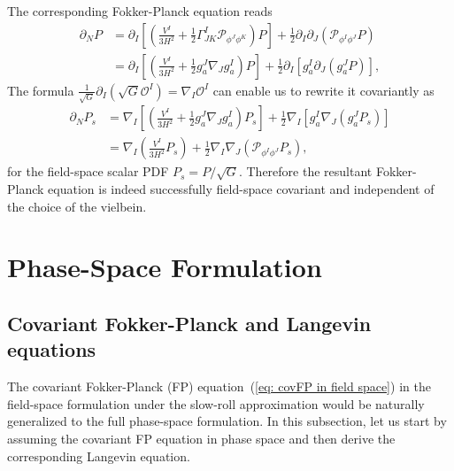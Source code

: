 \documentclass[aps, prd
, preprint
, nofootinbib 
, longbibliography
]{revtex4-1}
\newcommand{\calO}{\mathcal{O}}
\newcommand{\calP}{\mathcal{P}}
\newcommand{\bae}[1]{\begin{align} #1 \end{align}}
\begin{document}
The corresponding Fokker-Planck equation reads
\bae{
    \partial_NP&=\partial_I\left[\left(\frac{V^I}{3H^2}+\frac{1}{2}\Gamma^I_{JK}\calP_{\phi^J\phi^K}\right)P\right]+\frac{1}{2}\partial_I\partial_J(\calP_{\phi^I\phi^J}P) \nonumber \\
    &=\partial_I\left[\left(\frac{V^I}{3H^2}+\frac{1}{2}g_a^J\nabla_Jg^I_a\right)P\right]+\frac{1}{2}\partial_I\left[g^I_a\partial_J(g^J_aP)\right],
}
The formula $\frac{1}{\sqrt{G}}\partial_I(\sqrt{G}\calO^I)=\nabla_I\calO^I$ can enable us to rewrite it covariantly as
\bae{\label{eq: covFP in field space}
    \partial_NP_s&=\nabla_I\left[\left(\frac{V^I}{3H^2}+\frac{1}{2}g^J_a\nabla_Jg^I_a\right)P_s\right]+\frac{1}{2}\nabla_I\left[g^I_a\nabla_J(g^J_aP_s)\right] \nonumber \\
    &=\nabla_I\left(\frac{V^I}{3H^2}P_s\right)+\frac{1}{2}\nabla_I\nabla_J(\calP_{\phi^I\phi^J}P_s),
}
for the field-space scalar PDF $P_s=P/\sqrt{G}$. Therefore the resultant Fokker-Planck equation is indeed 
successfully field-space covariant and independent of the choice of the vielbein.




\section{Phase-Space Formulation}

\subsection{Covariant Fokker-Planck and Langevin equations}

The covariant Fokker-Planck (FP) equation~(\ref{eq: covFP in field space}) in the field-space formulation under the slow-roll approximation
would be naturally generalized to the full phase-space formulation.
In this subsection, let us start by assuming the covariant FP equation in phase space and then derive the corresponding Langevin equation.
\end{document}
